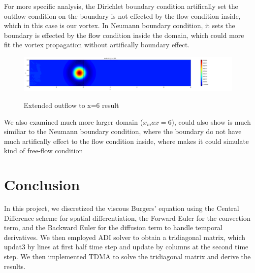 \documentclass[12pt]{article}
\begin{document}
For more specific analysis, the Dirichlet boundary condition 
artifically set the outflow condition on the boundary is not
effected by the flow condition inside, which in this case is 
our vortex. In Neumann boundary condition, it sets the boundary
is effected by the flow condition inside the domain, which could
more fit the vortex propagation without artifically boundary effect.



\begin{figure}[H]
    \includegraphics[width=1.8\linewidth]{figures6/6dE20.010t1.5.png}
    \label{IGs.jpg}
    \caption{Extended outflow to x=6 result}
\end{figure}

We also examined much more larger domain ($x_max = 6$), could 
also show is much similiar to the Neumann boundary condition,
where the boundary do not have much artifically effect to the 
flow condition inside, where makes it could simulate kind
of free-flow condition


\section{Conclusion}


In this project, we discretized the viscous Burgers' equation 
using the Central Difference scheme for 
spatial differentiation, the Forward Euler for 
the convection term, and the Backward Euler for 
the diffusion term to handle temporal derivatives. 
We then employed ADI solver 
to obtain a tridiagonal matrix, which updat3 by 
lines at first half
time step and update by columns at the second time step.
 We then implemented 
 TDMA to solve the tridiagonal matrix and derive the results.\\
\end{document}
